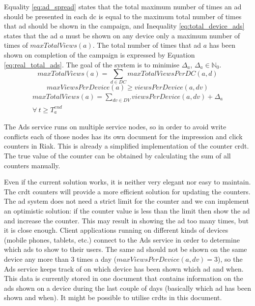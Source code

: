 Equality \ref{eq:ad_spread} states that the total maximum number of times an ad should be presented in each \gls{dc} is equal to  the maximum total number of times that ad should be shown in the campaign, and Inequality \ref{eq:total_device_ads} states that the ad $a$ must be shown on any device only a maximum number of times of $maxTotalViews(a)$. The total number of times that ad $a$ has been shown on completion of the campaign is expressed by Equation \ref{eq:real_total_ads}. The goal of the system is to minimise $\Delta_{a}$, $\Delta_{a} \in \mathbb{N}_{0}$.
\begin{equation} \label{eq:ad_spread}
	maxTotalViews(a) = \sum_{d \in DC} maxTotalViewsPerDC(a, d)
\end{equation}
\begin{equation} \label{eq:total_device_ads}
	maxViewsPerDevice(a) \ge viewsPerDevice(a, dv)
\end{equation}
\begin{multline} \label{eq:real_total_ads}
	maxTotalViews(a) = \sum_{dv \in DV} viewsPerDevice(a, dv) + \Delta_{a}\\ \forall ~  t \ge T^{end}_{a}
\end{multline}

The Ads service runs on multiple service nodes, so in order to avoid write conflicts each of those nodes has its own document for the impression and click counters in Riak. This is already a simplified implementation of the counter \gls{crdt}. The true value of the counter can be obtained by calculating the sum of all counters manually.

Even if the current solution works, it is neither very elegant nor easy to maintain. The \gls{crdt} counters will provide a more efficient solution for updating the counters. The ad system does not need a strict limit for the counter and we can implement an optimistic solution: if the counter value is less than the limit then show the ad and increase the counter. This may result in showing the ad too many times, but it is \textquotedbl{}close enough\textquotedbl{}. Client applications running on different kinds of devices (mobile phones, tablets, etc.) connect to the Ads service in order to determine which ads to show to their users. The same ad should not be shown on the same device any more than 3 times a day ($maxViewsPerDevice(a, dv) = 3$), so the Ads service keeps track of on which device has been shown which ad and when. This data is currently stored in one document that contains information on the ads shown on a device during the last couple of days (basically which ad has been shown and when). It might be possible to utilise \glspl{crdt} in this document.

